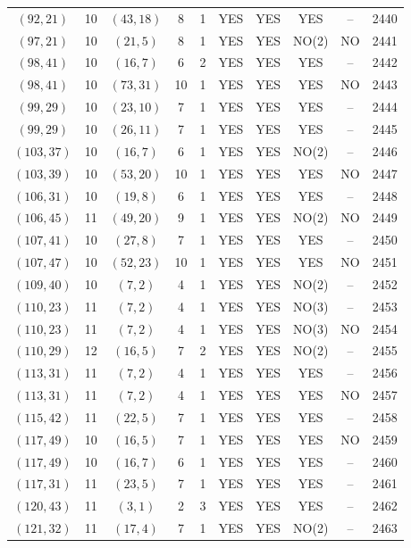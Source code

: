 \begin{longtable}{|c|c|c|c|c|c|c|c|c|c|}
$(92, 21)$ & 10 & $(43, 18)$ & 8 & 1 & YES & YES & YES & -- & 2440\\
$(97, 21)$ & 10 & $(21, 5)$ & 8 & 1 & YES & YES & NO(2) & NO & 2441\\
$(98, 41)$ & 10 & $(16, 7)$ & 6 & 2 & YES & YES & YES & -- & 2442\\
$(98, 41)$ & 10 & $(73, 31)$ & 10 & 1 & YES & YES & YES & NO & 2443\\
$(99, 29)$ & 10 & $(23, 10)$ & 7 & 1 & YES & YES & YES & -- & 2444\\
$(99, 29)$ & 10 & $(26, 11)$ & 7 & 1 & YES & YES & YES & -- & 2445\\
$(103, 37)$ & 10 & $(16, 7)$ & 6 & 1 & YES & YES & NO(2) & -- & 2446\\
$(103, 39)$ & 10 & $(53, 20)$ & 10 & 1 & YES & YES & YES & NO & 2447\\
$(106, 31)$ & 10 & $(19, 8)$ & 6 & 1 & YES & YES & YES & -- & 2448\\
$(106, 45)$ & 11 & $(49, 20)$ & 9 & 1 & YES & YES & NO(2) & NO & 2449\\
$(107, 41)$ & 10 & $(27, 8)$ & 7 & 1 & YES & YES & YES & -- & 2450\\
$(107, 47)$ & 10 & $(52, 23)$ & 10 & 1 & YES & YES & YES & NO & 2451\\
$(109, 40)$ & 10 & $(7, 2)$ & 4 & 1 & YES & YES & NO(2) & -- & 2452\\
$(110, 23)$ & 11 & $(7, 2)$ & 4 & 1 & YES & YES & NO(3) & -- & 2453\\
$(110, 23)$ & 11 & $(7, 2)$ & 4 & 1 & YES & YES & NO(3) & NO & 2454\\
$(110, 29)$ & 12 & $(16, 5)$ & 7 & 2 & YES & YES & NO(2) & -- & 2455\\
$(113, 31)$ & 11 & $(7, 2)$ & 4 & 1 & YES & YES & YES & -- & 2456\\
$(113, 31)$ & 11 & $(7, 2)$ & 4 & 1 & YES & YES & YES & NO & 2457\\
$(115, 42)$ & 11 & $(22, 5)$ & 7 & 1 & YES & YES & YES & -- & 2458\\
$(117, 49)$ & 10 & $(16, 5)$ & 7 & 1 & YES & YES & YES & NO & 2459\\
$(117, 49)$ & 10 & $(16, 7)$ & 6 & 1 & YES & YES & YES & -- & 2460\\
$(117, 31)$ & 11 & $(23, 5)$ & 7 & 1 & YES & YES & YES & -- & 2461\\
$(120, 43)$ & 11 & $(3, 1)$ & 2 & 3 & YES & YES & YES & -- & 2462\\
$(121, 32)$ & 11 & $(17, 4)$ & 7 & 1 & YES & YES & NO(2) & -- & 2463\\

\end{longtable}
